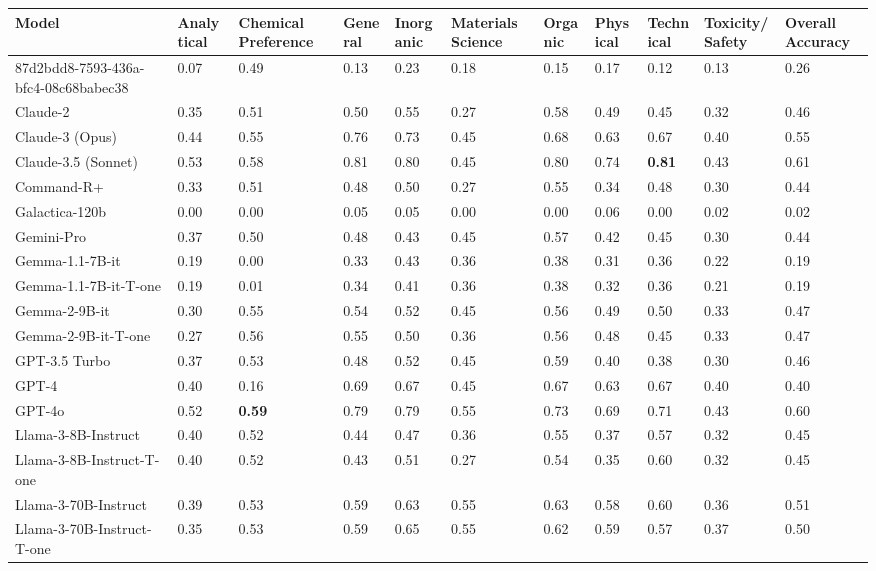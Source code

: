 \begin{tabular}{lllllllllll}
\toprule
Model & Analytical & Chemical Preference & General & Inorganic & Materials Science & Organic & Physical & Technical & Toxicity/Safety & Overall Accuracy \\
\midrule
87d2bdd8-7593-436a-bfc4-08c68babec38 & 0.07 & 0.49 & 0.13 & 0.23 & 0.18 & 0.15 & 0.17 & 0.12 & 0.13 & 0.26 \\
Claude-2 & 0.35 & 0.51 & 0.50 & 0.55 & 0.27 & 0.58 & 0.49 & 0.45 & 0.32 & 0.46 \\
Claude-3 (Opus) & 0.44 & 0.55 & 0.76 & 0.73 & 0.45 & 0.68 & 0.63 & 0.67 & 0.40 & 0.55 \\
Claude-3.5 (Sonnet) & 0.53 & 0.58 & 0.81 & 0.80 & 0.45 & 0.80 & 0.74 & \textbf{0.81} & 0.43 & 0.61 \\
Command-R+ & 0.33 & 0.51 & 0.48 & 0.50 & 0.27 & 0.55 & 0.34 & 0.48 & 0.30 & 0.44 \\
Galactica-120b & 0.00 & 0.00 & 0.05 & 0.05 & 0.00 & 0.00 & 0.06 & 0.00 & 0.02 & 0.02 \\
Gemini-Pro & 0.37 & 0.50 & 0.48 & 0.43 & 0.45 & 0.57 & 0.42 & 0.45 & 0.30 & 0.44 \\
Gemma-1.1-7B-it & 0.19 & 0.00 & 0.33 & 0.43 & 0.36 & 0.38 & 0.31 & 0.36 & 0.22 & 0.19 \\
Gemma-1.1-7B-it-T-one & 0.19 & 0.01 & 0.34 & 0.41 & 0.36 & 0.38 & 0.32 & 0.36 & 0.21 & 0.19 \\
Gemma-2-9B-it & 0.30 & 0.55 & 0.54 & 0.52 & 0.45 & 0.56 & 0.49 & 0.50 & 0.33 & 0.47 \\
Gemma-2-9B-it-T-one & 0.27 & 0.56 & 0.55 & 0.50 & 0.36 & 0.56 & 0.48 & 0.45 & 0.33 & 0.47 \\
GPT-3.5 Turbo & 0.37 & 0.53 & 0.48 & 0.52 & 0.45 & 0.59 & 0.40 & 0.38 & 0.30 & 0.46 \\
GPT-4 & 0.40 & 0.16 & 0.69 & 0.67 & 0.45 & 0.67 & 0.63 & 0.67 & 0.40 & 0.40 \\
GPT-4o & 0.52 & \textbf{0.59} & 0.79 & 0.79 & 0.55 & 0.73 & 0.69 & 0.71 & 0.43 & 0.60 \\
Llama-3-8B-Instruct & 0.40 & 0.52 & 0.44 & 0.47 & 0.36 & 0.55 & 0.37 & 0.57 & 0.32 & 0.45 \\
Llama-3-8B-Instruct-T-one & 0.40 & 0.52 & 0.43 & 0.51 & 0.27 & 0.54 & 0.35 & 0.60 & 0.32 & 0.45 \\
Llama-3-70B-Instruct & 0.39 & 0.53 & 0.59 & 0.63 & 0.55 & 0.63 & 0.58 & 0.60 & 0.36 & 0.51 \\
Llama-3-70B-Instruct-T-one & 0.35 & 0.53 & 0.59 & 0.65 & 0.55 & 0.62 & 0.59 & 0.57 & 0.37 & 0.50 \\

\end{tabular}
